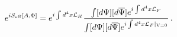 \begin{equation}
e^{i S_{\rm eff}[A,\Phi]} = e^{i\int d^4 x {\mathcal L}_H} \frac{
\int[d\Psi][d\overline{\Psi}] e^{i\int d^4x {\mathcal L}_F}}{ \int[d\Psi][d\overline{\Psi}] e^{i\int d^4x {\mathcal L}_F |_{\rm V=0}}} \, .
\end{equation}

